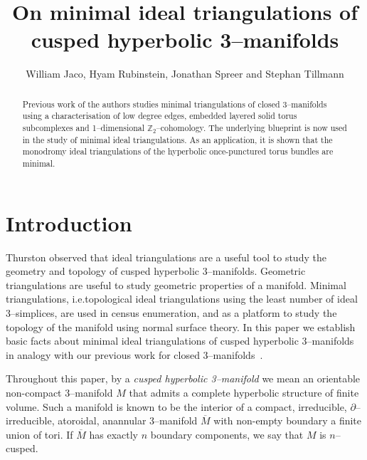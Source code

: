 \documentclass[a4paper]{gtart}
\def\manifold{M}
\def\Z{\mathbb{Z}}
\theoremstyle{plain}
\theoremstyle{definition}
\theoremstyle{remark}
\numberwithin{equation}{section}
\begin{document}
\title{On minimal ideal triangulations of cusped hyperbolic 3--manifolds}
\author{William Jaco, Hyam Rubinstein, Jonathan Spreer and Stephan Tillmann}

\begin{abstract}
Previous work of the authors studies minimal triangulations of closed 3--manifolds using a characterisation of low degree edges, embedded layered solid torus subcomplexes and 1--dimensional $\Z_2$--cohomology. The underlying blueprint is now used in the study of minimal ideal triangulations. As an application, it is shown that the monodromy ideal triangulations of the hyperbolic once-punctured torus bundles are minimal.
\end{abstract}

\makeshorttitle



\section{Introduction}

Thurston observed that ideal triangulations are a useful tool to study the geometry and topology of cusped hyperbolic 3--manifolds. Geometric triangulations are useful to study geometric properties of a manifold. Minimal triangulations, i.e.\thinspace topological ideal triangulations using the least number of ideal 3--simplices, are used in census enumeration, and as a platform to study the topology of the manifold using normal surface theory. In this paper we establish basic facts about minimal ideal triangulations of cusped hyperbolic 3--manifolds in analogy with our previous work for closed 3--manifolds~\cite{Jaco-Z2-2017,Jaco-minimal-2009, Jaco-Z2-2013}.

Throughout this paper, by a \emph{cusped hyperbolic 3--manifold} we mean an orientable non-compact 3--manifold $\manifold$ that admits a complete hyperbolic structure of finite volume. Such a manifold is known to be the interior of a compact, irreducible, $\partial$--irreducible, atoroidal, anannular 3--manifold $\overline{\manifold}$ with non-empty boundary a finite union of tori. If $\overline{\manifold}$ has exactly $n$ boundary components, we say that $\manifold$ is $n$--cusped.
\end{document}
